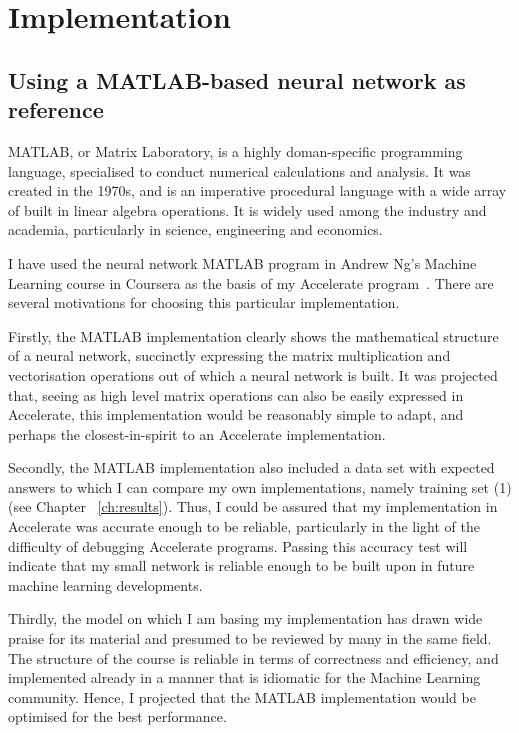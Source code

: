 \newcommand{\liam}[1]{$\langle$ \textit{\textbf{Liam} #1} $\rangle\ $}
\chapter{Implementation}\label{ch:impl}

\section{Using a MATLAB-based neural network as reference} \label{se:impl.matlab.nn}

MATLAB, or Matrix Laboratory, is a highly doman-specific programming language, specialised to conduct numerical calculations and analysis. It was created in the 1970s, and is an imperative procedural language with a wide array of built in linear algebra operations. It is widely used among the industry and academia, particularly in science, engineering and economics.

I have used the neural network MATLAB program in Andrew Ng's Machine Learning course in Coursera as the basis of my Accelerate program~\cite{Ng12}. There are several motivations for choosing this particular implementation. 

Firstly, the MATLAB implementation clearly shows the mathematical structure of a neural network, succinctly expressing the matrix multiplication and vectorisation operations out of which a neural network is built. It was projected that, seeing as high level matrix operations can also be easily expressed in Accelerate, this implementation would be reasonably simple to adapt, and perhaps the closest-in-spirit to an Accelerate implementation.

Secondly, the MATLAB implementation also included a data set with expected answers to which I can compare my own implementations, namely training set (1) (see Chapter ~\ref{ch:results}). Thus, I could be assured that my implementation in Accelerate was accurate enough to be reliable, particularly in the light of the difficulty of debugging Accelerate programs. Passing this accuracy test will indicate that my small network is reliable enough to be built upon in future machine learning developments.

Thirdly, the model on which I am basing my implementation has drawn wide praise for its material and presumed to be reviewed by many in the same field. The structure of the course is reliable in terms of correctness and efficiency, and implemented already in a manner that is idiomatic for the Machine Learning community. Hence, I projected that the MATLAB implementation would be optimised for the best performance.

